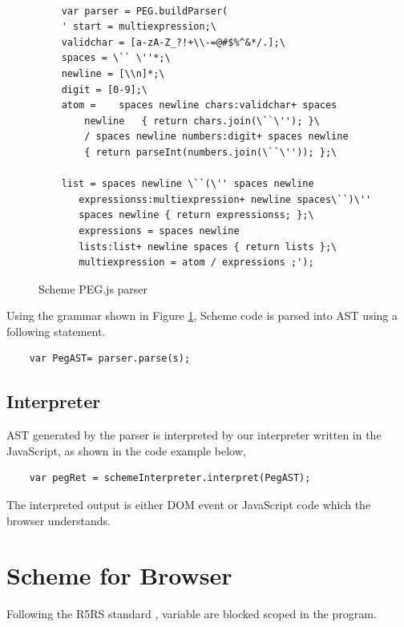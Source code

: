\begin{figure}[h]
	\begin{lstlisting}  

	var parser = PEG.buildParser( 
	' start = multiexpression;\
	validchar = [a-zA-Z_?!+\\-=@#$%^&*/.];\
	spaces = \`` \''*;\
	newline = [\\n]*;\
	digit = [0-9];\
	atom =    spaces newline chars:validchar+ spaces 
	    newline   { return chars.join(\``\''); }\
	    / spaces newline numbers:digit+ spaces newline     
        { return parseInt(numbers.join(\``\'')); };\
    
	list = spaces newline \``(\'' spaces newline 
	   expressionss:multiexpression+ newline spaces\``)\''
	   spaces newline { return expressionss; };\
	   expressions = spaces newline 
	   lists:list+ newline spaces { return lists };\
	   multiexpression = atom / expressions ;');
	\end{lstlisting}
	\caption{Scheme PEG.js parser}
	\label{fig:schemepeg}
\end{figure}

Using the grammar shown in Figure \ref{fig:schemepeg}, Scheme code is parsed into AST using a following statement.

\begin{lstlisting}
	var PegAST= parser.parse(s);
\end{lstlisting}




\subsection{Interpreter}

AST generated by the parser is interpreted by our interpreter written in the JavaScript, as shown in the code example below,


\begin{lstlisting}
	var pegRet = schemeInterpreter.interpret(PegAST);
\end{lstlisting}


The interpreted output is either DOM event or JavaScript code which the browser understands.

\section{Scheme for Browser} 

Following the R5RS standard \cite{Adams:1998:RRA:290229.290234}, variable are  blocked scoped in the program. 

